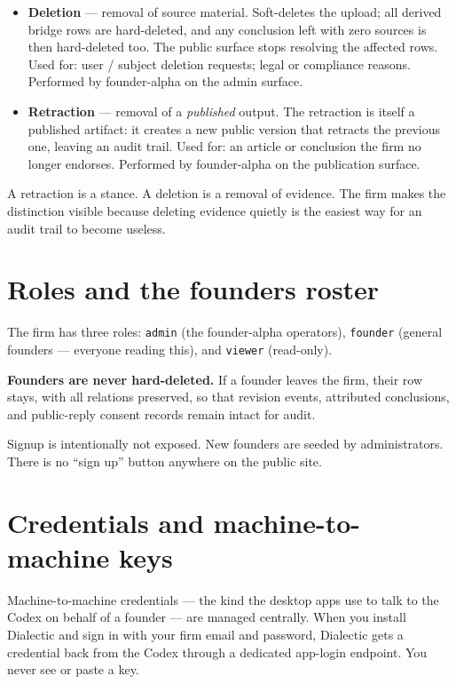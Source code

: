 \documentclass[11pt]{article}
\begin{document}
\begin{itemize}[leftmargin=*,itemsep=0.3em]
  \item \textbf{Deletion} --- removal of source material. Soft-deletes
        the upload; all derived bridge rows are hard-deleted, and any
        conclusion left with zero sources is then hard-deleted too.
        The public surface stops resolving the affected rows. Used
        for: user / subject deletion requests; legal or compliance
        reasons. Performed by founder-alpha on the admin surface.
  \item \textbf{Retraction} --- removal of a \emph{published} output.
        The retraction is itself a published artifact: it creates a
        new public version that retracts the previous one, leaving an
        audit trail. Used for: an article or conclusion the firm no
        longer endorses. Performed by founder-alpha on the
        publication surface.
\end{itemize}

A retraction is a stance. A deletion is a removal of evidence. The
firm makes the distinction visible because deleting evidence quietly
is the easiest way for an audit trail to become useless.

\section{Roles and the founders roster}

The firm has three roles: \texttt{admin} (the founder-alpha
operators), \texttt{founder} (general founders --- everyone reading
this), and \texttt{viewer} (read-only).

\textbf{Founders are never hard-deleted.} If a founder leaves the
firm, their row stays, with all relations preserved, so that revision
events, attributed conclusions, and public-reply consent records
remain intact for audit.

Signup is intentionally not exposed. New founders are seeded by
administrators. There is no ``sign up'' button anywhere on the public
site.

\section{Credentials and machine-to-machine keys}

Machine-to-machine credentials --- the kind the desktop apps use to
talk to the Codex on behalf of a founder --- are managed centrally.
When you install Dialectic and sign in with your firm email and
password, Dialectic gets a credential back from the Codex through a
dedicated app-login endpoint. You never see or paste a key.
\end{document}
